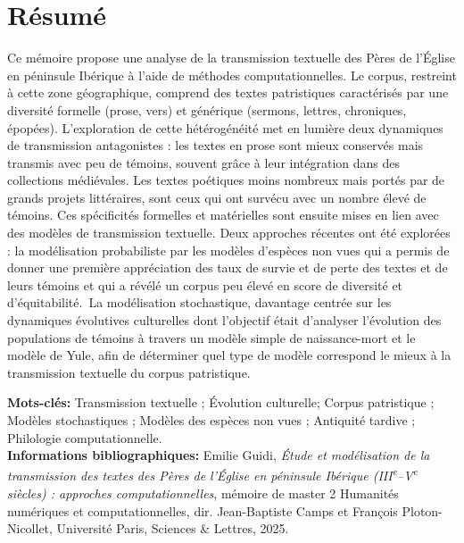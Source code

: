 \documentclass[a4paper,twoside,12pt]{book}
\begin{document}
\cleardoublepage

\section*{Résumé}

Ce mémoire propose une analyse de la transmission textuelle des Pères de l’Église en péninsule Ibérique à l’aide de méthodes computationnelles. Le corpus, restreint à cette zone géographique, comprend des textes patristiques caractérisés par une diversité formelle (prose, vers) et générique (sermons, lettres, chroniques, épopées). L'exploration de cette hétérogénéité met en lumière deux dynamiques de transmission antagonistes : les textes en prose sont mieux conservés mais transmis avec peu de témoins, souvent grâce à leur intégration dans des collections médiévales. Les textes poétiques moins nombreux mais portés par de grands projets littéraires, sont ceux qui ont survécu avec un nombre élevé de témoins. Ces spécificités formelles et matérielles sont ensuite mises en lien avec des modèles de transmission textuelle. Deux approches récentes ont été explorées : la modélisation probabiliste par les modèles d'espèces non vues qui a permis de donner une première appréciation des taux de survie et de perte des textes et de leurs témoins et qui a révélé un corpus peu élevé en score de diversité et d'équitabilité.  La modélisation stochastique, davantage centrée sur les dynamiques évolutives culturelles dont l'objectif était d'analyser l’évolution des populations de témoins à travers un modèle simple de naissance-mort et le modèle de Yule, afin de déterminer quel type de modèle correspond le mieux à la transmission textuelle du corpus patristique.


\medskip

\textbf{Mots-clés:} Transmission textuelle ; Évolution culturelle; Corpus patristique ; Modèles stochastiques ; Modèles des espèces non vues  ; Antiquité tardive ; Philologie computationnelle. \\

\textbf{Informations bibliographiques:} Emilie Guidi, \textit{Étude et modélisation de la transmission des textes des Pères de l’Église en péninsule Ibérique (III\textsuperscript{e}–V\textsuperscript{e} siècles)
: approches computationnelles}, mémoire de master 2 \og Humanités numériques et computationnelles\fg{}, dir. Jean-Baptiste Camps et François Ploton-Nicollet, Université Paris, Sciences \& Lettres, 2025.
\end{document}
